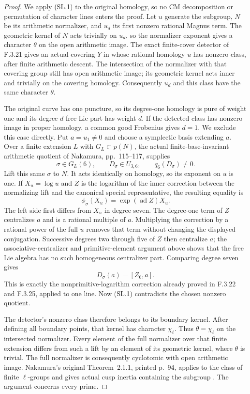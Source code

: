 \begin{proof}
We apply (SL.1) to the original homology, so no CM decomposition
or permutation of character lines enters the proof.
Let $u$ generate the subgroup, $N$ be its arithmetic normalizer,
and $u_d$ its first nonzero rational Magnus term.
The geometric kernel of $N$ acts trivially on $u_d$, so the
normalizer exponent gives a character $\theta$ on the open
arithmetic image. The exact finite-cover detector of F.3.21
gives an actual covering $Y$ in whose rational homology $u$
has nonzero class, after finite arithmetic descent.
The intersection of the normalizer with that covering group
still has open arithmetic image; its geometric kernel acts
inner and trivially on the covering homology. Consequently
$u_d$ and this class have the same character $\theta$.

The original curve has one puncture, so its degree-one
homology is pure of weight one and its degree-$d$ free-Lie
part has weight $d$. If the detected class has nonzero image
in proper homology, a common good Frobenius gives $d=1$.
We exclude this case directly. Put $a=u_1\ne0$ and choose
a symplectic basis extending $a$. Over a finite extension
$L$ with $G_L\subset p(N)$, the actual finite-base-invariant
arithmetic quotient of Nakamura, pp.~115--117, supplies
\[
 \sigma\in G_L(6),\qquad D_\sigma\in U_{3,6},
                         \qquad q_6(D_\sigma)\ne0.
\]
Lift this same $\sigma$ to $N$. It acts identically on
homology, so its exponent on $u$ is one. If $X_u=\log u$
and $Z$ is the logarithm of the inner correction between
the normalizing lift and the canonical special representative,
the resulting equality is
\[
                   \phi_\sigma(X_u)=\exp(\operatorname{ad}Z)X_u.
\]
The left side first differs from $X_u$ in degree seven.
The degree-one term of $Z$ centralizes $a$ and is a rational
multiple of $a$. Multiplying the correction by a rational
power of the full $u$ removes that term without changing
the displayed conjugation. Successive degrees two through
five of $Z$ then centralize $a$; the associative-centralizer and
primitive-element argument above shows that the free Lie algebra
has no such homogeneous centralizer part. Comparing
degree seven gives
\[
                     D_\sigma(a)=[Z_6,a].
\]
This is exactly the nonprimitive-logarithm correction already
proved in F.3.22 and F.3.25, applied to one line. Now (SL.1)
contradicts the chosen nonzero quotient.

The detector's nonzero class therefore belongs to its boundary
kernel. After defining all boundary points, that kernel has
character $\chi_\ell$. Thus $\theta=\chi_\ell$ on the
intersected normalizer. Every element of the full normalizer
over that finite extension differs from such a lift by an
element of its geometric kernel, where $\theta$ is trivial.
The full normalizer is consequently cyclotomic with open
arithmetic image. Nakamura's original Theorem~2.1.1,
printed p.~94, applies to the class of finite $\ell$-groups
and gives actual cusp inertia containing the subgroup
\cite{AuditNakamura1994}. The argument concerns every prime.
\end{proof}

